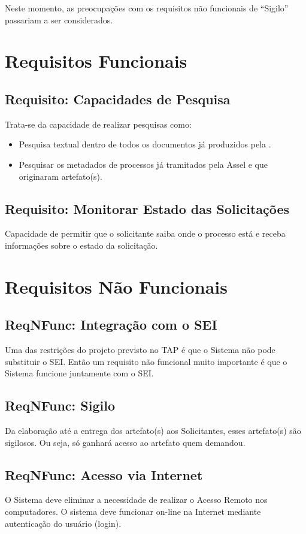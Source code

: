 	Neste momento, as preocupações com os requisitos não funcionais de ``Sigilo'' passariam a ser considerados. 	


\section{Requisitos Funcionais}


\subsection{Requisito: Capacidades de Pesquisa}

Trata-se da capacidade de realizar pesquisas como:

\begin{itemize}
	\item Pesquisa textual dentro de todos os documentos já produzidos pela \ASSEL.
	
	\item Pesquisar os metadados de processos já tramitados pela Assel e que originaram artefato(s).	
\end{itemize}

\subsection{Requisito: Monitorar Estado das Solicitações}

Capacidade de permitir que o solicitante saiba onde o processo está e receba informações sobre o estado da solicitação.

\section{Requisitos Não Funcionais}

\subsection{ReqNFunc: Integração com o SEI}

Uma das restrições do projeto previsto no TAP é que o Sistema não pode substituir o SEI. Então um requisito não funcional muito importante é que o Sistema funcione juntamente com o SEI.


\subsection{ReqNFunc: Sigilo}

Da elaboração até a entrega dos artefato(s) aos Solicitantes, esses artefato(s) são sigilosos. Ou seja, só ganhará acesso ao artefato quem demandou.

\subsection{ReqNFunc: Acesso via Internet}

	O Sistema deve eliminar a necessidade de realizar o Acesso Remoto nos computadores. O sistema deve funcionar on-line na Internet mediante autenticação do usuário (login).

